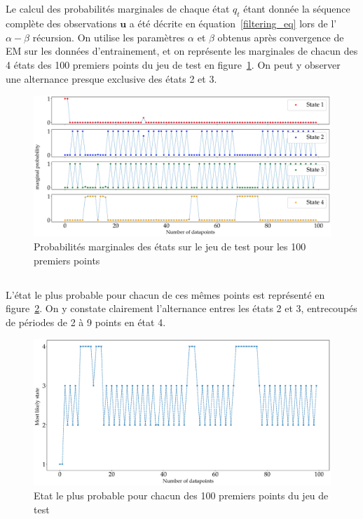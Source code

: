 \documentclass[12pt,a4paper,onecolumn]{article}
\begin{document}
\subsection{}

Le calcul des probabilités marginales de chaque état \(q_t\) étant donnée la séquence complète des observations \(\bm{u}\) a été décrite en équation~\eqref{filtering_eq} lors de l'\(\alpha-\beta\) récursion. On utilise les paramètres \(\alpha\) et \(\beta\) obtenus après convergence de EM sur les données d'entrainement, et on représente les marginales de chacun des 4 états des 100 premiers points du jeu de test en figure~\ref{fig_9_filtering}. On peut y observer une alternance presque exclusive des états 2 et 3.

\begin{figure}[H]
	\centering
	\includegraphics[width = 1.0\textwidth]{9_filtering}
	\caption{Probabilités marginales des états sur le jeu de test pour les 100 premiers points}
	\label{fig_9_filtering}
\end{figure}

\subsection{}

L'état le plus probable pour chacun de ces mêmes points est représenté en figure~\ref{fig_10_most_likely}. On y constate clairement l'alternance entres les états 2 et 3, entrecoupés de périodes de 2 à 9 points en état 4.

\begin{figure}[H]
	\centering
	\includegraphics[width = 1.0\textwidth]{10_most_likely}
	\caption{Etat le plus probable pour chacun des 100 premiers points du jeu de test}
	\label{fig_10_most_likely}
\end{figure}
\end{document}
